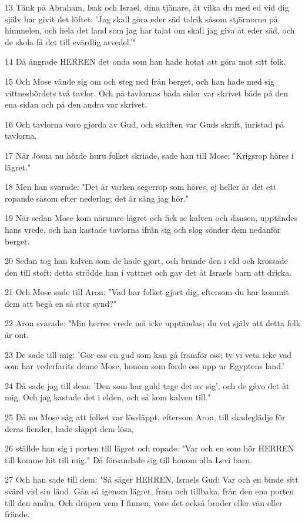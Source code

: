 \par 13 Tänk på Abraham, Isak och Israel, dina tjänare, åt vilka du med ed vid dig själv har givit det löftet: 'Jag skall göra eder säd talrik såsom stjärnorna på himmelen, och hela det land som jag har talat om skall jag giva åt eder säd, och de skola få det till evärdlig arvedel.'"
\par 14 Då ångrade HERREN det onda som han hade hotat att göra mot sitt folk.
\par 15 Och Mose vände sig om och steg ned från berget, och han hade med sig vittnesbördets två tavlor. Och på tavlornas båda sidor var skrivet både på den ena sidan och på den andra var skrivet.
\par 16 Och tavlorna voro gjorda av Gud, och skriften var Guds skrift, inristad på tavlorna.
\par 17 När Josua nu hörde huru folket skriade, sade han till Mose: "Krigsrop höres i lägret."
\par 18 Men han svarade: "Det är varken segerrop som höres, ej heller är det ett ropande såsom efter nederlag; det är sång jag hör."
\par 19 När sedan Mose kom närmare lägret och fick se kalven och dansen, upptändes hans vrede, och han kastade tavlorna ifrån sig och slog sönder dem nedanför berget.
\par 20 Sedan tog han kalven som de hade gjort, och brände den i eld och krossade den till stoft; detta strödde han i vattnet och gav det åt Israels barn att dricka.
\par 21 Och Mose sade till Aron: "Vad har folket gjort dig, eftersom du har kommit dem att begå en så stor synd?"
\par 22 Aron svarade: "Min herres vrede må icke upptändas; du vet själv att detta folk är ont.
\par 23 De sade till mig: 'Gör oss en gud som kan gå framför oss; ty vi veta icke vad som har vederfarits denne Mose, honom som förde oss upp ur Egyptens land.'
\par 24 Då sade jag till dem: 'Den som har guld tage det av sig'; och de gåvo det åt mig. Och jag kastade det i elden, och så kom kalven till."
\par 25 Då nu Mose såg att folket var lössläppt, eftersom Aron, till skadeglädje för deras fiender, hade släppt dem lösa,
\par 26 ställde han sig i porten till lägret och ropade: "Var och en som hör HERREN till komme hit till mig." Då församlade sig till honom alla Levi barn.
\par 27 Och han sade till dem: "Så säger HERREN, Israels Gud: Var och en binde sitt svärd vid sin länd. Gån så igenom lägret, fram och tillbaka, från den ena porten till den andra, Och dräpen vem I finnen, vore det också broder eller vän eller frände.
